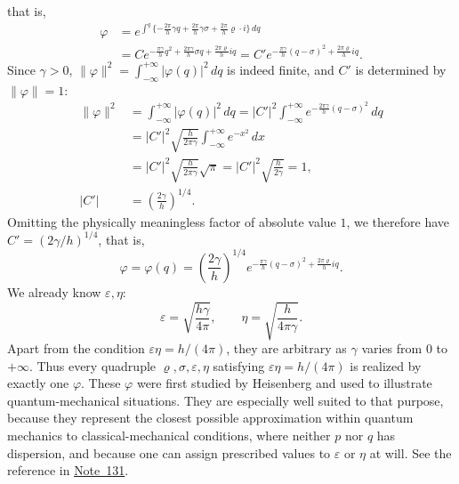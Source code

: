 \documentclass[fontsize=13pt,twoside,openany,headings=normal,parskip=false,bookmarkpackage=false,DIV=calc]{scrbook}
\begin{document}
that is,
\begin{align*}
\varphi&=e^{\int^q\{-\frac{2\pi}h\gamma q+\frac{2\pi}h\gamma\sigma+\frac{2\pi}h\varrho\cdot i\}\,dq}\\
&=Ce^{-\frac{\pi\gamma}hq^2+\frac{2\pi\gamma}h\sigma q+\frac{2\pi\varrho}hiq}
=C'e^{-\frac{\pi\gamma}h(q-\sigma)^2+\frac{2\pi\varrho}hiq}.
\end{align*}
\hypertarget{origpage-125}{}%
Since $\gamma>0$, $\|\varphi\|^2=\int_{-\infty}^{+\infty}|\varphi(q)|^2\,dq$ is indeed finite, and $C'$ is determined by $\|\varphi\|=1$:
\begin{align*}
\|\varphi\|^2&=\int_{-\infty}^{+\infty}|\varphi(q)|^2\,dq
=|C'|^2\int_{-\infty}^{+\infty}e^{-\frac{2\pi\gamma}h(q-\sigma)^2}\,dq\\
&=|C'|^2\sqrt{\frac h{2\pi\gamma}}\int_{-\infty}^{+\infty}e^{-x^2}\,dx\\
&=|C'|^2\sqrt{\frac h{2\pi\gamma}}\sqrt\pi
=|C'|^2\sqrt{\frac h{2\gamma}}=1,\\
|C'|&=\left(\frac{2\gamma}h\right)^{1/4}.
\end{align*}
Omitting the physically meaningless factor of absolute value $1$, we therefore have $C'=(2\gamma/h)^{1/4}$, that is,
\[
\varphi=\varphi(q)=\left(\frac{2\gamma}h\right)^{1/4}
e^{-\frac{\pi\gamma}h(q-\sigma)^2+\frac{2\pi\varrho}hiq}.
\]
We already know $\varepsilon,\eta$:
\[
\varepsilon=\sqrt{\frac{h\gamma}{4\pi}},\qquad
\eta=\sqrt{\frac h{4\pi\gamma}}.
\]
Apart from the condition $\varepsilon\eta=h/(4\pi)$, they are arbitrary as $\gamma$ varies from $0$ to $+\infty$. Thus every quadruple $\varrho,\sigma,\varepsilon,\eta$ satisfying $\varepsilon\eta=h/(4\pi)$ is realized by exactly one $\varphi$. These $\varphi$ were first studied by Heisenberg and used to illustrate quantum-mechanical situations. They are especially well suited to that purpose, because they represent the closest possible approximation within quantum mechanics to classical-mechanical conditions, where neither $p$ nor $q$ has dispersion, and because one can assign prescribed values to $\varepsilon$ or $\eta$ at will. See the reference in \hyperlink{note-131}{Note~131}.
\end{document}
